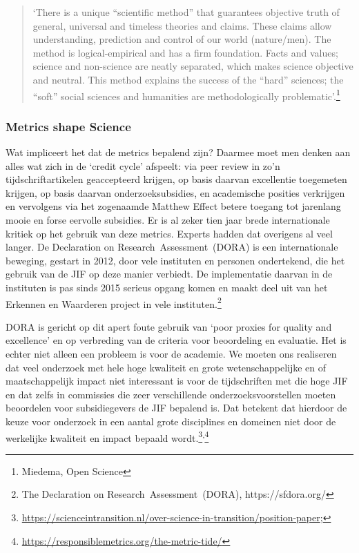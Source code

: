 \documentclass{jote-book}
\begin{document}
	\begin{quote}
		\itshape

		‘There is a unique “scientific method” that guarantees objective truth of general, universal and timeless theories and claims. These claims allow understanding, prediction and control of our world (nature/men). The method is logical-empirical and has a firm foundation. Facts and values; science and non-science are neatly separated, which makes science objective and neutral. This method explains the success of the “hard” sciences; the “soft” social sciences and humanities are methodologically problematic'.\footnote{Miedema, Open Science}
	\end{quote}

	\subsubsection{Metrics shape Science}



	Wat impliceert het dat de metrics bepalend zijn? Daarmee moet men denken aan alles wat zich in de ‘credit cycle' afspeelt: via peer review in zo'n tijdschriftartikelen geaccepteerd krijgen, op basis daarvan excellentie toegemeten krijgen, op basis daarvan onderzoeksubsidies, en academische posities verkrijgen en vervolgens via het zogenaamde Matthew Effect betere toegang tot jarenlang mooie en forse eervolle subsidies. Er is al zeker tien jaar brede internationale kritiek op het gebruik van deze metrics. Experts hadden dat overigens al veel langer. De Declaration on Research Assessment (DORA) is een internationale beweging, gestart in 2012, door vele instituten en personen ondertekend, die het gebruik van de JIF op deze manier verbiedt. De implementatie daarvan in de instituten is pas sinds 2015 serieus opgang komen en maakt deel uit van het Erkennen en Waarderen project in vele instituten.\footnote{The Declaration on Research Assessment (DORA), https://sfdora.org/}



	DORA is gericht op dit apert foute gebruik van ‘poor proxies for quality and excellence' en op verbreding van de criteria voor beoordeling en evaluatie. Het is echter niet alleen een probleem is voor de academie. We moeten ons realiseren dat veel onderzoek met hele hoge kwaliteit en grote wetenschappelijke en of maatschappelijk impact niet interessant is voor de tijdschriften met die hoge JIF en dat zelfs in commissies die zeer verschillende onderzoeksvoorstellen moeten beoordelen voor subsidiegevers de JIF bepalend is. Dat betekent dat hierdoor de keuze voor onderzoek in een aantal grote disciplines en domeinen niet door de werkelijke kwaliteit en impact bepaald wordt.\footnote{\href{https://scienceintransition.nl/over-science-in-transition/position-paper}{https://scienceintransition.nl/over-science-in-transition/position-paper}; }\textsuperscript{,}\footnote{\href{https://responsiblemetrics.org/the-metric-tide/}{https://responsiblemetrics.org/the-metric-tide/}}
\end{document}
